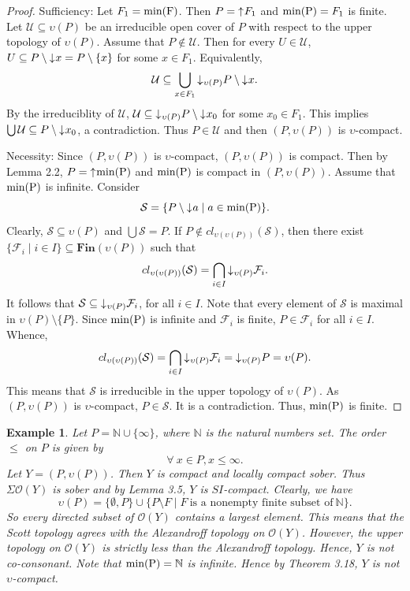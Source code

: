 \documentclass[preprint,12pt]{elsarticle}
\numberwithin{equation}{section}
\newtheorem{example}[theorem]{Example}
\newcommand{\dn}{\mathord{\downarrow}\hspace{0.05em}}
\newcommand{\up}{\mathord{\uparrow}\hspace{0.05em}}
\begin{document}
\begin{proof} Sufficiency: Let $F_{1}={\rm min(F)}$. Then $P=\up F_{1}$ and ${\rm min(P)}=F_{1}$ is finite.  Let $\mathcal{U}\subseteq\upsilon(P)$ be an irreducible open cover of $P$ with respect to the upper topology of $\upsilon(P)$. Assume that $P\not\in\mathcal{U}$. Then for every $U\in\mathcal{U}$, $U\subseteq P\setminus\dn x=P\setminus\{x\}$ for some $x\in F_{1}$. Equivalently, $$\mathcal{U}\subseteq\bigcup\limits_{x\in F_{1}}\dn_{\upsilon(P)}P\setminus\dn x.$$
By the irreduciblity of $\mathcal{U}$, $\mathcal{U}\subseteq\dn_{\upsilon(P)}P\setminus\dn x_{0}$ for some $x_{0}\in F_{1}$. This implies $\bigcup\mathcal{U}\subseteq P\setminus\dn x_{0}$, a contradiction. Thus $P\in\mathcal{U}$ and then $(P,\upsilon(P))$ is $\upsilon$-compact.




Necessity: Since $(P,\upsilon(P))$ is $\upsilon$-compact, $(P,\upsilon(P))$ is compact. Then by Lemma 2.2, $P=\up {\rm min(P)}$ and ${\rm min(P)}$ is compact in $(P,\upsilon(P))$. Assume that ${\rm min(P)}$ is infinite. Consider $$\mathcal{S}=\{P\setminus\dn a\mid a\in {\rm min(P)}\}.$$ Clearly, $\mathcal{S}\subseteq\upsilon(P)$ and $\bigcup\mathcal{S}=P$. If $P\not\in cl_{\upsilon(\upsilon(P))}(\mathcal{S})$, then there exist $\{\mathcal{F}_{i}\mid i\in I\}\subseteq \mathbf{Fin}(\upsilon(P))$ such that $$cl_{\upsilon(\upsilon(P))}(\mathcal{S})=\bigcap\limits_{i\in I}\dn_{\upsilon(P)}\mathcal{F}_{i}.$$ It follows that $\mathcal{S}\subseteq\dn_{\upsilon(P)}\mathcal{F}_{i}$, for all $i\in I$.
Note that every element of $\mathcal{S}$ is maximal in $\upsilon(P)\setminus\{P\}$. Since ${\rm min(P)}$ is infinite and $\mathcal{F}_{i}$ is finite, $P\in\mathcal{F}_{i}$ for all $i\in I$. Whence, $$cl_{\upsilon(\upsilon(P))}(\mathcal{S})=\bigcap\limits_{i\in I}\dn_{\upsilon(P)}\mathcal{F}_{i}=\dn_{\upsilon(P)} P=\upsilon(P).$$ This means that $\mathcal{S}$ is irreducible in the upper topology of $\upsilon(P)$. As
$(P,\upsilon(P))$ is $\upsilon$-compact, $P\in\mathcal{S}$. It is a contradiction. Thus, ${\rm min(P)}$ is finite.
\end{proof}

\begin{example}{\rm  Let $P=\mathbb{N}\cup\{\infty\}$, where $\mathbb{N}$ is the natural numbers set. The order $\leq$ on $P$ is given by
$$\forall\ x\in P, x\leq\infty.$$
Let $Y=(P,\upsilon(P))$. Then $Y$ is compact and locally compact sober. Thus $\Sigma\mathcal{O}(Y)$ is sober and by Lemma 3.5, $Y$ is $SI$-compact. Clearly, we have $$\upsilon(P)=\{\emptyset,P\}\cup\{P\setminus F\mid F\ \mbox{is a nonempty finite subset of}\ \mathbb{N}\}.$$ So every directed subset of $\mathcal{O}(Y)$ contains a largest element. This means that the Scott topology agrees with the Alexandroff topology on $\mathcal{O}(Y)$. However, the upper topology on $\mathcal{O}(Y)$ is strictly less than the Alexandroff topology. Hence, $Y$ is not co-consonant. Note that ${\rm min(P)}=\mathbb{N}$ is infinite. Hence by Theorem 3.18, $Y$ is not $\upsilon$-compact.}
\end{example}
\end{document}
